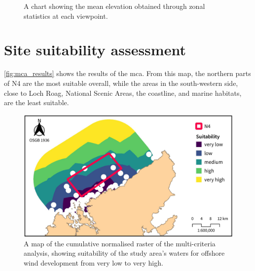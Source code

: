 \begin{figure}
  \centering
  \caption{A chart showing the mean elevation obtained through zonal statistics at each viewpoint. \label{fig:zs_elevation}}
\end{figure}

\section{Site suitability assessment}

\autoref{fig:mca_results} shows the results of the \gls{mca}. From this map, the northern parts of N4 are the most suitable overall, while the areas in the south-western side, close to Loch Roag, National Scenic Areas, the coastline, and marine habitats, are the least suitable.

\begin{figure}
  \centering
  \includegraphics{images/maps/mca_results}
  \caption{A map of the cumulative normalised raster of the multi-criteria
  analysis, showing suitability of the study area's waters for
  offshore wind development from very low to very high. \label{fig:mca_results}}
\end{figure}
